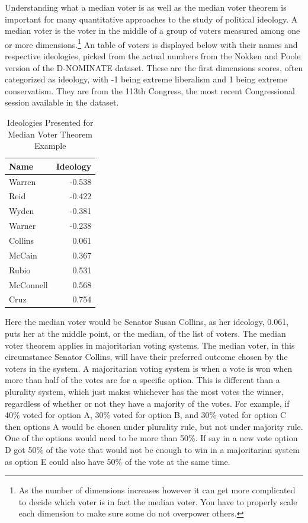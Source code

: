 \documentclass[12pt,twoside]{reedthesis}
\begin{document}
  Understanding what a median voter is as well as the median voter theorem
  is important for many quantitative approaches to the study of political
  ideology. A median voter is the voter in the middle of a group of voters
  measured among one or more
  dimensions.\footnote{As the number of dimensions increases however it can get more complicated to decide which voter is in fact the median voter. You have to properly scale each dimension to make sure some do not overpower others.}
  An table of voters is displayed below with their names and respective
  ideologies, picked from the actual numbers from the Nokken and Poole
  version of the D-NOMINATE dataset. These are the first dimensions
  scores, often categorized as ideology, with -1 being extreme liberalism
  and 1 being extreme conservatism. They are from the 113th Congress, the
  most recent Congressional session available in the dataset.
  
  \begin{table}[]
  \centering
  \caption{Ideologies Presented for Median Voter Theorem Example}
  \begin{tabular}{l|r}
  Name      & Ideology \\ \hline
  Warren    & -0.538   \\
  Reid      & -0.422   \\
  Wyden     & -0.381   \\
  Warner    & -0.238   \\
  Collins   & 0.061    \\
  McCain    & 0.367    \\
  Rubio     & 0.531    \\
  McConnell & 0.568    \\
  Cruz      & 0.754   
  \end{tabular}
  \end{table}
  
  Here the median voter would be Senator Susan Collins, as her ideology,
  0.061, puts her at the middle point, or the median, of the list of
  voters. The median voter theorem applies in majoritarian voting systems.
  The median voter, in this circumstance Senator Collins, will have their
  preferred outcome chosen by the voters in the system. A majoritarian
  voting system is when a vote is won when more than half of the votes are
  for a specific option. This is different than a plurality system, which
  just makes whichever has the most votes the winner, regardless of
  whether or not they have a majority of the votes. For example, if 40\%
  voted for option A, 30\% voted for option B, and 30\% voted for option C
  then options A would be chosen under plurality rule, but not under
  majority rule. One of the options would need to be more than 50\%. If
  say in a new vote option D got 50\% of the vote that would not be enough
  to win in a majoritarian system as option E could also have 50\% of the
  vote at the same time.
  
\end{document}
